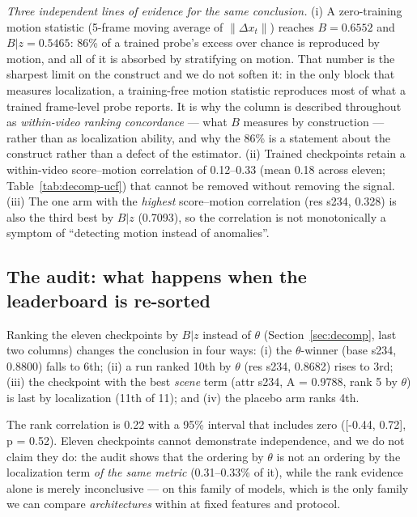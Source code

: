 \documentclass[number,preprint,12pt]{elsarticle}
\begin{document}
\emph{Three independent lines of evidence for the same conclusion.} (i) A
zero-training motion statistic (5-frame moving average of \(\lVert\Delta x_t\rVert\)) reaches
\(B=0.6552\) and \(B|z=0.5465\): 86\% of a trained probe's excess over chance is
reproduced by motion, and all of it is absorbed by stratifying on motion. That
number is the sharpest limit on the construct and we do not soften it: in the
only block that measures localization, a training-free motion statistic
reproduces most of what a trained frame-level probe reports. It is why the column
is described throughout as \emph{within-video ranking concordance} --- what \(B\)
measures by construction --- rather than as localization ability, and why the
86\% is a statement about the construct rather than a defect of the estimator. (ii)
Trained checkpoints retain a within-video score--motion correlation of
0.12--0.33 (mean 0.18 across eleven; Table~\ref{tab:decomp-ucf}) that cannot be removed without
removing the signal. (iii) The one arm with the \emph{highest} score--motion
correlation (res s234, 0.328) is also the third best by \(B|z\) (0.7093), so the
correlation is not monotonically a symptom of ``detecting motion instead of
anomalies''.

\subsection{The audit: what happens when the leaderboard is re-sorted}\label{sec:audit}

Ranking the eleven checkpoints by \(B|z\) instead of \(\theta\) (Section~\ref{sec:decomp}, last two columns)
changes the conclusion in four ways: (i) the \(\theta\)-winner (base s234, 0.8800) falls to
6th; (ii) a run ranked 10th by \(\theta\) (res s234, 0.8682) rises to 3rd; (iii) the
checkpoint with the best \emph{scene} term (attr s234, A = 0.9788, rank 5 by \(\theta\)) is
last by localization (11th of 11); and (iv) the placebo arm ranks 4th.

The rank correlation is 0.22 with a 95\% interval that includes zero
({[}-0.44, 0.72{]}, p = 0.52). Eleven checkpoints cannot demonstrate independence,
and we do not claim they do: the audit shows that the ordering by
\(\theta\) is not an ordering by the localization term \emph{of the same metric}
(0.31--0.33\% of it), while the rank evidence alone is merely inconclusive --- on
this family of models, which is the only family we can compare \emph{architectures}
within at fixed features and protocol.
\end{document}

